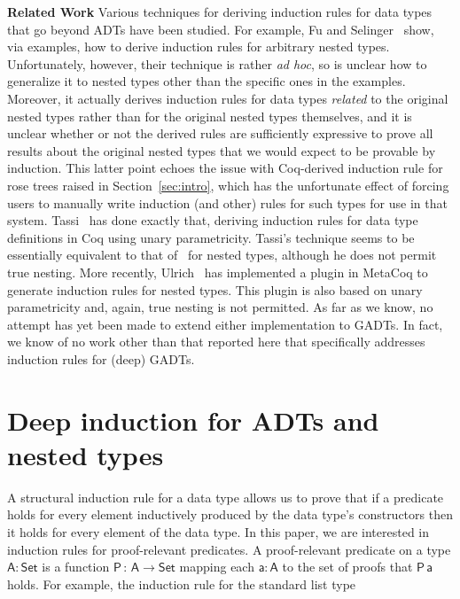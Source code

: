 \documentclass[9pt]{entcs}
\begin{document}
{\bf Related Work\/} Various techniques for deriving induction rules
for data types that go beyond ADTs have been studied. For example, Fu
and Selinger~\cite{fs18} show, via examples, how to derive induction
rules for arbitrary nested types. Unfortunately, however, their
technique is rather {\em ad hoc}, so is unclear how to generalize it
to nested types other than the specific ones in the
examples. Moreover, it actually derives induction rules for data types
{\em related} to the original nested types rather than for the
original nested types themselves, and it is unclear whether or not the
derived rules are sufficiently expressive to prove all results about
the original nested types that we would expect to be provable by
induction. This latter point echoes the issue with Coq-derived
induction rule for rose trees raised in Section~\ref{sec:intro}, which
has the unfortunate effect of forcing users to manually write
induction (and other) rules for such types for use in that
system. Tassi~\cite{tas19} has done exactly that, deriving induction
rules for data type definitions in Coq using unary
parametricity. Tassi's technique seems to be essentially equivalent to
that of~\cite{jp19} for nested types, although he does not permit true
nesting. More recently, Ulrich~\cite{ull20} has implemented a plugin
in MetaCoq to generate induction rules for nested types. This plugin
is also based on unary parametricity and, again, true nesting is not
permitted.  As far as we know, no attempt has yet been made to extend
either implementation to GADTs. In fact, we know of no work other than
that reported here that specifically addresses induction rules for
(deep) GADTs.

\section{Deep induction for ADTs and nested types}\label{sec:ADTs-and-nesteds}

A structural induction rule for a data type allows us to prove that if
a predicate holds for every element inductively produced by the data
type's constructors then it holds for every element of the data type.
In this paper, we are interested in induction rules for proof-relevant
predicates.  A proof-relevant predicate on a type $\mathsf{A : Set}$
is a function $\mathsf{P\,:\,A \to Set}$ mapping each $\mathsf{a : A}$
to the set of proofs that $\mathsf{P\,a}$ holds.  For example, the
induction rule for the standard list type

\vspace*{-0.1in}
\end{document}
